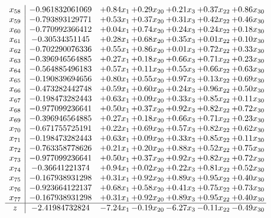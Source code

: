 \documentclass[8pt]{article}
\begin{document}
\[\begin{array}{c| c c@{\hskip 2pt} c@{\hskip 2pt} c@{\hskip 2pt} c@{\hskip 2pt} c@{\hskip 2pt} }
 x_{58}   &  -0.961832061069 & +  0.84 x_{1} & +  0.29 x_{20} & +  0.21 x_{3} & +  0.37 x_{22} & +  0.86 x_{30}\\
 x_{59}   &  -0.793893129771 & +  0.53 x_{1} & +  0.37 x_{20} & +  0.31 x_{3} & +  0.42 x_{22} & +  0.46 x_{30}\\
 x_{60}   &  -0.770992366412 & +  0.04 x_{1} & +  0.74 x_{20} & +  0.24 x_{3} & +  0.24 x_{22} & +  0.18 x_{30}\\
 x_{61}   &  -0.30534351145 & +  0.28 x_{1} & +  0.68 x_{20} & +  0.35 x_{3} & +  0.01 x_{22} & +  0.10 x_{30}\\
 x_{62}   &  -0.702290076336 & +  0.55 x_{1} & +  0.86 x_{20} & +  0.01 x_{3} & +  0.72 x_{22} & +  0.33 x_{30}\\
 x_{63}   &  -0.396946564885 & +  0.27 x_{1} & +  0.18 x_{20} & +  0.66 x_{3} & +  0.71 x_{22} & +  0.23 x_{30}\\
 x_{64}   &  -0.564885496183 & +  0.57 x_{1} & +  0.11 x_{20} & +  0.55 x_{3} & +  0.66 x_{22} & +  0.63 x_{30}\\
 x_{65}   &  -0.190839694656 & +  0.80 x_{1} & +  0.55 x_{20} & +  0.97 x_{3} & +  0.13 x_{22} & +  0.69 x_{30}\\
 x_{66}   &  -0.473282442748 & +  0.59 x_{1} & +  0.60 x_{20} & +  0.24 x_{3} & +  0.96 x_{22} & +  0.50 x_{30}\\
 x_{67}   &  -0.198473282443 & +  0.63 x_{1} & +  0.09 x_{20} & +  0.33 x_{3} & +  0.85 x_{22} & +  0.11 x_{30}\\
 x_{68}   &  -0.977099236641 & +  0.50 x_{1} & +  0.37 x_{20} & +  0.92 x_{3} & +  0.82 x_{22} & +  0.72 x_{30}\\
 x_{69}   &  -0.396946564885 & +  0.27 x_{1} & +  0.18 x_{20} & +  0.66 x_{3} & +  0.71 x_{22} & +  0.23 x_{30}\\
 x_{70}   &  -0.671755725191 & +  0.22 x_{1} & +  0.69 x_{20} & +  0.57 x_{3} & +  0.82 x_{22} & +  0.62 x_{30}\\
 x_{71}   &  -0.198473282443 & +  0.63 x_{1} & +  0.09 x_{20} & +  0.33 x_{3} & +  0.85 x_{22} & +  0.11 x_{30}\\
 x_{72}   &  -0.763358778626 & +  0.21 x_{1} & +  0.20 x_{20} & +  0.88 x_{3} & +  0.52 x_{22} & +  0.75 x_{30}\\
 x_{73}   &  -0.977099236641 & +  0.50 x_{1} & +  0.37 x_{20} & +  0.92 x_{3} & +  0.82 x_{22} & +  0.72 x_{30}\\
 x_{74}   &  -0.36641221374 & +  0.94 x_{1} & +  0.02 x_{20} & +  0.22 x_{3} & +  0.81 x_{22} & +  0.52 x_{30}\\
 x_{75}   &  -0.167938931298 & +  0.31 x_{1} & +  0.92 x_{20} & +  0.89 x_{3} & +  0.95 x_{22} & +  0.40 x_{30}\\
 x_{76}   &  -0.923664122137 & +  0.68 x_{1} & +  0.58 x_{20} & +  0.41 x_{3} & +  0.75 x_{22} & +  0.73 x_{30}\\
 x_{77}   &  -0.167938931298 & +  0.31 x_{1} & +  0.92 x_{20} & +  0.89 x_{3} & +  0.95 x_{22} & +  0.40 x_{30}\\
\hline
z    &  -2.41984732824 & -7.24 x_{1} & -0.19 x_{20} & -6.27 x_{3} & -0.11 x_{22} & -0.49 x_{30}\\
\end{array}\]
\end{document}
